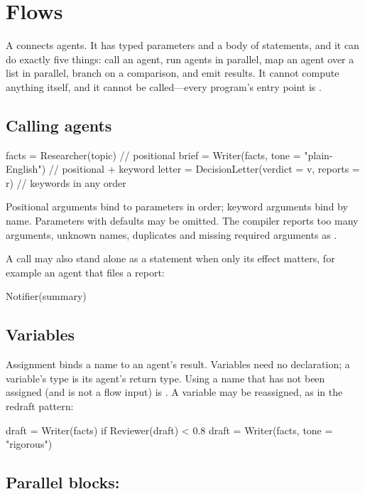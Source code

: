 \chapter{Flows}
\label{ch:flows}

A  connects agents. It has typed parameters and a body of statements, and it can do exactly five things: call an agent, run agents in parallel, map an agent over a list in parallel, branch on a comparison, and emit results. It cannot compute anything itself, and it cannot be called---every program's entry point is .

\section{Calling agents}

\begin{algo}
facts  = Researcher(topic)                       // positional
brief  = Writer(facts, tone = "plain-English")   // positional + keyword
letter = DecisionLetter(verdict = v, reports = r) // keywords in any order
\end{algo}

Positional arguments bind to parameters in order; keyword arguments bind by name. Parameters with defaults may be omitted. The compiler reports too many arguments, unknown names, duplicates and missing required arguments as .

A call may also stand alone as a statement when only its effect matters, for example an agent that files a report:

\begin{algo}
Notifier(summary)
\end{algo}

\section{Variables}

Assignment binds a name to an agent's result. Variables need no declaration; a variable's type is its agent's return type. Using a name that has not been assigned (and is not a flow input) is . A variable may be reassigned, as in the redraft pattern:

\begin{algo}
draft = Writer(facts)
if Reviewer(draft) < 0.8 { draft = Writer(facts, tone = "rigorous") }
\end{algo}

\section{Parallel blocks: }

